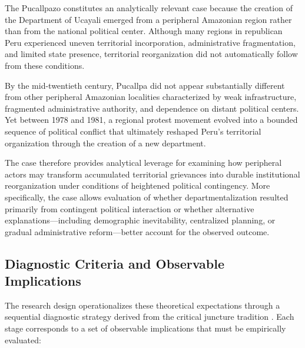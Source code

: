 \documentclass[12pt]{article}
\begin{document}
The Pucallpazo constitutes an analytically relevant case because the creation of the Department of Ucayali emerged from a peripheral Amazonian region rather than from the national political center. Although many regions in republican Peru experienced uneven territorial incorporation, administrative fragmentation, and limited state presence, territorial reorganization did not automatically follow from these conditions.

By the mid-twentieth century, Pucallpa did not appear substantially different from other peripheral Amazonian localities characterized by weak infrastructure, fragmented administrative authority, and dependence on distant political centers. Yet between 1978 and 1981, a regional protest movement evolved into a bounded sequence of political conflict that ultimately reshaped Peru’s territorial organization through the creation of a new department.

The case therefore provides analytical leverage for examining how peripheral actors may transform accumulated territorial grievances into durable institutional reorganization under conditions of heightened political contingency. More specifically, the case allows evaluation of whether departmentalization resulted primarily from contingent political interaction or whether alternative explanations---including demographic inevitability, centralized planning, or gradual administrative reform---better account for the observed outcome.


\subsection{Diagnostic Criteria and Observable Implications}

The research design operationalizes these theoretical expectations through a sequential diagnostic strategy derived from the critical juncture tradition \parencite{collier_shaping_1991,capoccia_study_2007,collier_critical_2022}. Each stage corresponds to a set of observable implications that must be empirically evaluated:
\end{document}
